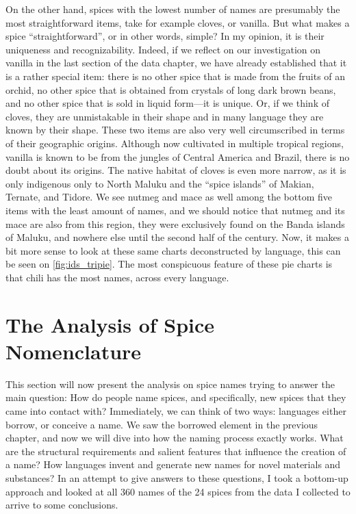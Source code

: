 On the other hand, spices with the lowest number of names are presumably the most straightforward items, take for example cloves, or vanilla. But what makes a spice ``straightforward'', or in other words, simple? In my opinion, it is their uniqueness and recognizability. Indeed, if we reflect on our investigation on vanilla in the last section of the data chapter, we have already established that it is a rather special item: there is no other spice that is made from the fruits of an orchid, no other spice that is obtained from crystals of long dark brown beans, and no other spice that is sold in liquid form---it is unique. Or, if we think of cloves, they are unmistakable in their shape and in many language they are known by their shape. These two items are also very well circumscribed in terms of their geographic origins. Although now cultivated in multiple tropical regions, vanilla is known to be from the jungles of Central America and Brazil, there is no doubt about its origins. The native habitat of cloves is even more narrow, as it is only indigenous only to North Maluku and the ``spice islands'' of Makian, Ternate, and Tidore. We see nutmeg and mace as well among the bottom five items with the least amount of names, and we should notice that nutmeg and its mace are also from this region, they were exclusively found on the Banda islands of Maluku, and nowhere else until the second half of the  century. Now, it makes a bit more sense to look at these same charts deconstructed by language, this can be seen on \cref{fig:ids_tripie}. The most conspicuous feature of these pie charts is that chili has the most names, across every language.



\section{The Analysis of Spice Nomenclature}
\label{sec:analysis}

This section will now present the analysis on spice names trying to answer the main question: How do people name spices, and specifically, new spices that they came into contact with? Immediately, we can think of two ways: languages either borrow, or conceive a name. We saw the borrowed element in the previous chapter, and now we will dive into how the naming process exactly works. What are the  structural requirements and salient features that influence the creation of a name? How languages invent and generate new names for novel materials and substances? In an attempt to give answers to these questions, I took a bottom-up approach and looked at all 360 names of the 24 spices from the data I collected to arrive to some conclusions. 

